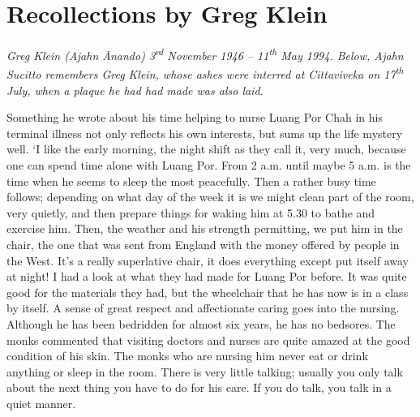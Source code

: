 
\chapter{Recollections by Greg Klein}

\emph{Greg Klein (Ajahn Ānando) 3\textsuperscript{rd} November 1946 --
11\textsuperscript{th} May 1994.  Below, Ajahn Sucitto remembers Greg
Klein, whose ashes were interred at Cittaviveka on
17\textsuperscript{th} July, when a plaque he had had made was also
laid.}

Something he wrote about his time helping to nurse Luang Por Chah in his
terminal illness not only reflects his own interests, but sums up the
life mystery well. `I like the early morning, the night shift as they
call it, very much, because one can spend time alone with Luang Por. 
From 2 a.m. until maybe 5 a.m. is the time when he seems to sleep the
most peacefully. Then a rather busy time follows; depending on what day
of the week it is we might clean part of the room, very quietly, and
then prepare things for waking him at 5.30 to bathe and exercise him. 
Then, the weather and his strength permitting, we put him in the chair, 
the one that was sent from England with the money offered by people in
the West. It's a really superlative chair, it does everything except put
itself away at night! I had a look at what they had made for Luang Por
before. It was quite good for the materials they had, but the wheelchair
that he has now is in a class by itself. A sense of great respect and
affectionate caring goes into the nursing. Although he has been
bedridden for almost six years, he has no bedsores. The monks commented
that visiting doctors and nurses are quite amazed at the good condition
of his skin. The monks who are nursing him never eat or drink anything
or sleep in the room. There is very little talking; usually you only
talk about the next thing you have to do for his care. If you do talk, 
you talk in a quiet manner.


